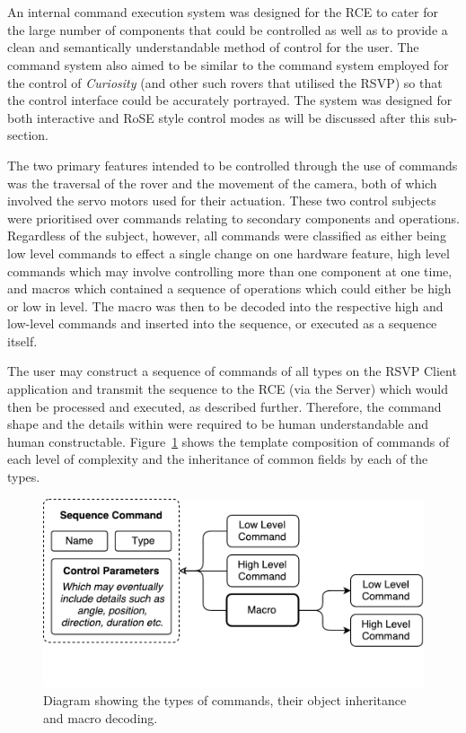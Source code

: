         \\\\
          An internal command execution system was designed for the RCE to cater for the large number of components that could be controlled as well as to provide a clean and semantically understandable method of control for the user. The command system also aimed to be similar to the command system employed for the control of \textit{Curiosity} (and other such rovers that utilised the RSVP) so that the control interface could be accurately portrayed. The system was designed for both interactive and RoSE style control modes as will be discussed after this sub-section.
          
          The two primary features intended to be controlled through the use of commands was the traversal of the rover and the movement of the camera, both of which involved the servo motors used for their actuation. These two control subjects were prioritised over commands relating to secondary components and operations. Regardless of the subject, however, all commands were classified as either being low level commands to effect a single change on one hardware feature, high level commands which may involve controlling more than one component at one time, and macros which contained a sequence of operations which could either be high or low in level. The macro was then to be decoded into the respective high and low-level commands and inserted into the sequence, or executed as a sequence itself.
          
          The user may construct a sequence of commands of all types on the RSVP Client application and transmit the sequence to the RCE (via the Server) which would then be processed and executed, as described further. Therefore, the command shape and the details within were required to be human understandable and human constructable. Figure~\ref{fig:softDesign-cmdStructureDesign} shows the template composition of commands of each level of complexity and the inheritance of common fields by each of the types.
          
          \begin{figure}[h!]
            \centering
            \includegraphics[width=0.65\linewidth]{figures/softDesign-cmdStructureDesign}
            \caption[Diagram showing the types of commands, their object inheritance and macro decoding.]{Diagram showing the types of commands, their object inheritance and macro decoding.}
            \label{fig:softDesign-cmdStructureDesign}
          \end{figure}
          

